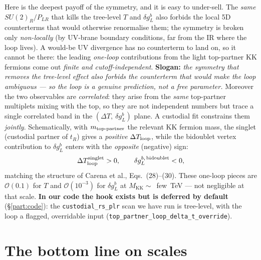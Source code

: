 \documentclass[11pt]{article}
\newcommand{\MKK}{M_{\mathrm{KK}}}
\newcommand{\SUR}{SU(2)_R}
\newcommand{\PLR}{P_{LR}}
\newcommand{\code}[1]{\texttt{#1}}
\theoremstyle{definition}
\begin{document}
Here is the deepest payoff of the symmetry, and it is easy to under-sell. The
\emph{same} $\SUR/\PLR$ that kills the tree-level $T$ and $\delta g_L^b$ also
forbids the local 5D counterterms that would otherwise renormalise them; the
symmetry is broken only \emph{non-locally} (by UV-brane boundary conditions, far
from the IR where the loop lives). A would-be UV divergence has no counterterm to
land on, so it cannot be there: the leading \emph{one-loop} contributions from
the light top-partner KK fermions come out \emph{finite and cutoff-independent}.
\textbf{Slogan:} \emph{the symmetry that removes the tree-level effect also
forbids the counterterm that would make the loop ambiguous --- so the loop is a
genuine prediction, not a free parameter.} Moreover the two observables are
\emph{correlated}: they arise from the \emph{same} top-partner multiplets mixing
with the top, so they are not independent numbers but trace a single correlated
band in the $(\Delta T,\ \delta g_L^b)$ plane. A custodial fit constrains them
\emph{jointly}.
Schematically, with $m_{\rm top\text{-}partner}$ the relevant KK fermion mass,
the singlet (custodial partner of $t_R$) gives a \emph{positive}
$\Delta T_{\rm loop}$, while the bidoublet vertex contribution to $\delta g_L^b$
enters with the \emph{opposite} (negative) sign:
\begin{equation}
\Delta T^{\rm singlet}_{\rm loop} > 0, \qquad
\delta g_L^{b,\,\rm bidoublet} < 0,
\label{eq:loopsigns}
\end{equation}
matching the structure of Carena et al., Eqs.~(28)--(30). These one-loop pieces
are $\mathcal{O}(0.1)$ for $T$ and $\mathcal{O}(10^{-3})$ for $\delta g_L^b$ at
$\MKK\sim$~few~TeV --- not negligible at that scale. \textbf{In our code the
hook exists but is deferred by default} (\S\ref{part:code}): the
\code{custodial\_rs\_plr} scan we have run is tree-level, with the loop a flagged,
overridable input (\code{top\_partner\_loop\_delta\_t\_override}).

\section{The bottom line on scales}
\label{sec:scales}
\end{document}
